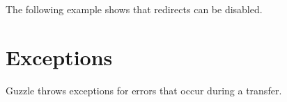 \documentclass[a4paper,11pt,spanish]{sphinxmanual}
\begin{document}
The following example shows that redirects can be disabled.

\begin{sphinxVerbatim}[commandchars=\\\{\}]
    \PYG{p}{[}
      
\PYG{p}{]);}
 
\end{sphinxVerbatim}


\chapter{Exceptions}
\label{\detokenize{quickstart:exceptions}}
Guzzle throws exceptions for errors that occur during a transfer.
\end{document}
